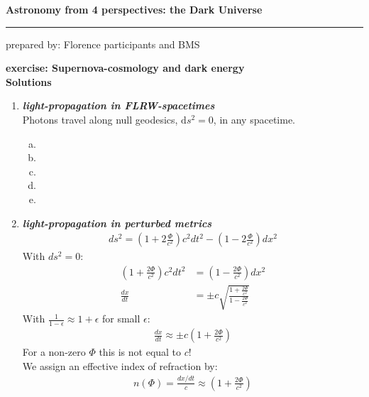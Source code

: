\documentclass[a4paper,12pt]{article}
\newcommand{\question}[1]{\textbf{\textit{#1}}}
\newcommand{\HRule}{\rule{\linewidth}{0.3mm}}
\newcommand{\dd}{\mathrm{d}}
\begin{document}
	\pagestyle{empty}
	
	\begin{center}
		\LARGE \textbf{Astronomy from 4 perspectives: the Dark Universe}
		\HRule
	\end{center}
	\begin{flushright}
		prepared by: Florence participants and BMS
	\end{flushright}
	\begin{center}
		{\Large \textbf{exercise: Supernova-cosmology and dark energy}}\\
		\vspace*{2mm}
		{\Large \textbf{Solutions}}
		
	\end{center}
	\vspace{5mm}
	
	\begin{enumerate}
		
		\item \question{light-propagation in FLRW-spacetimes}\\
		Photons travel along null geodesics, $\dd s^2=0$, in any spacetime. 
		\begin{enumerate}[(a)]
			\item
			\item
			\item
			\item
			\item
		\end{enumerate}
		
		
		\item \question{light-propagation in perturbed metrics}\\
		\begin{align}
		ds^2=\left(1+2\frac{\Phi}{c^2}\right)c^2dt^2-\left(1-2\frac{\Phi}{c^2}\right)dx^2 
		\end{align}
		With $ds^2=0$:
		\begin{align}
		\left( 1+\frac{2\Phi}{c^2}\right)c^2dt^2 &= \left(1-\frac{2\Phi}{c^2}\right) dx^2\\
		\frac{dx}{dt}&=\pm c\sqrt{\frac{1+\frac{2\Phi}{c^2}}{1-\frac{2\Phi}{c^2}}}
		\end{align}
		With $\frac{1}{1-\epsilon}\approx 1+\epsilon$ for small $\epsilon$:
		\begin{align}
		\frac{dx}{dt}\approx\pm c\left(1+\frac{2\Phi}{c^2}\right)
		\end{align} 
		For a non-zero $\Phi$ this is not equal to $c$! \\
		We assign an effective index of refraction by:
		\begin{align}
		n(\Phi)=\frac{dx/dt}{c}\approx \left(1+\frac{2\Phi}{c^2}\right)
		\end{align}
		

\end{enumerate}
\end{document}
